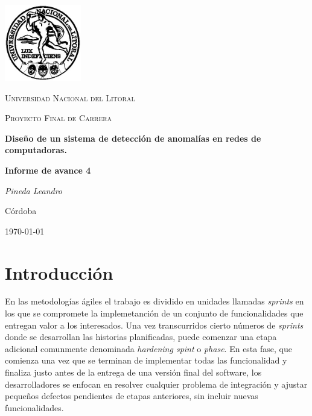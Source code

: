 \documentclass[a4paper,10pt, oneside]{article}
\begin{document}
	
\begin{titlepage}
	\centering
	\includegraphics[width=0.25\textwidth]{../../Universidad_del_Litoral}\par\vspace{1cm}
	{\scshape\LARGE Universidad Nacional del Litoral \par}
	\vspace{1cm}
	{\scshape\Large Proyecto Final de Carrera\par}
	\vspace{1.5cm}
	{\huge\bfseries Diseño de un sistema de detección de anomalías en redes de computadoras.\par}
	\vspace{4cm}
	{\huge\bfseries Informe de avance 4\par}
	\vfill
	
	{\Large \itshape Pineda Leandro\par}
	
	
	\large Córdoba\par
	{\large \today\par}	
\end{titlepage}

\modulolinenumbers[5]
\linenumbers

\section{Introducción}
En las metodologías ágiles el trabajo es dividido en unidades llamadas \textit{sprints} en los que se compromete la implemetanción de un conjunto de funcionalidades que entregan valor a los interesados. Una vez transcurridos cierto números de \textit{sprints} donde se desarrollan las historias planificadas, puede comenzar una etapa adicional comunmente denominada \textit{hardening spint} o \textit{phase}. En esta fase, que comienza una vez que se terminan de implementar todas las funcionalidad y finaliza justo antes de la entrega de una versión final del software, los desarrolladores se enfocan en resolver cualquier problema de integración y ajustar pequeños defectos pendientes de etapas anteriores, sin incluir nuevas funcionalidades. 
\end{document}
